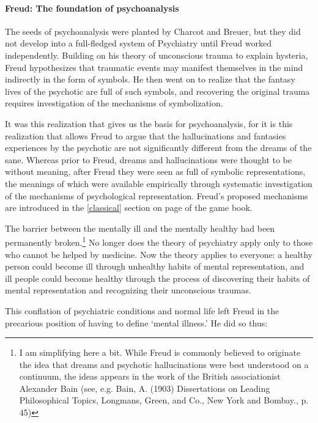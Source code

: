 \paragraph{Freud: The foundation of psychoanalysis}
\label{freud:thefoundationofpsychoanalysis}

The seeds of psychoanalysis were planted by Charcot and Breuer, but they did not develop into a full-fledged system of Psychiatry until Freud worked independently. Building on his theory of unconscious trauma to explain hysteria, Freud hypothesizes that traumatic events may manifest themselves in the mind indirectly in the form of symbols. He then went on to realize that the fantasy lives of the psychotic are full of such symbols, and recovering the original trauma requires investigation of the mechanisms of symbolization.

It was this realization that gives us the basis for psychoanalysis, for it is this realization that allows Freud to argue that the hallucinations and fantasies experiences by the psychotic are not significantly different from the dreams of the sane. Whereas prior to Freud, dreams and hallucinations were thought to be without meaning, after Freud they were seen as full of symbolic representations, the meanings of which were available empirically through systematic investigation of the mechanisms of psychological representation. Freud's proposed mechanisms are introduced in the \ref{classical} section on page \pageref{classical} of the game book.

The barrier between the mentally ill and the mentally healthy had been permanently broken.\footnote{I am simplifying here a bit. While Freud is commonly believed to originate the idea that dreams and psychotic hallucinations were best understood on a continuum, the ideas appears in the work of the British associationist Alexander Bain (see, e.g. Bain, A. (1903) Dissertations on Leading Philosophical Topics, Longmans, Green, and Co., New York and Bombay., p. 45)} No longer does the theory of psychiatry apply only to those who cannot be helped by medicine. Now the theory applies to everyone: a healthy person could become ill through unhealthy habits of mental representation, and ill people could become healthy through the process of discovering their habits of mental representation and recognizing their unconscious traumas. 

This conflation of psychiatric conditions and normal life left Freud in the precarious position of having to define `mental illness.' He did so thus:

